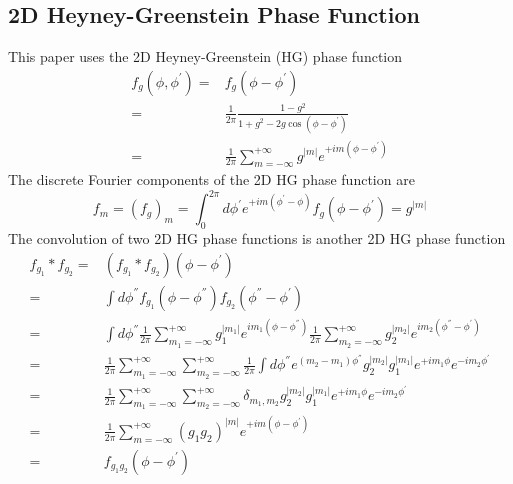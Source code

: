 \documentclass [10pt,letterpaper]{article}
\begin{document}
\subsection{2D Heyney-Greenstein Phase Function}
\label{sub:2d-heyney-greenstein-phase-function} 
This paper uses the 2D Heyney-Greenstein (HG) phase function
\begin{equation} \label{eq:hg-phase-function}
	\begin{split}
		f_g(\phi,\phi^\prime)
		=&
		f_g(\phi-\phi^\prime)
		\\
		=&
		\frac{1}{2\pi}
		\frac{1-g^2}{1+g^2-2g\cos(\phi-\phi^\prime)} 
		\\
		=&
		\frac{1}{2\pi} 
		\sum\limits_{m=-\infty}^{+\infty}
		g^{\lvert m \rvert}
		e^{+i m (\phi-\phi^\prime)} 
	\end{split}
\end{equation}
The discrete Fourier components of the 2D HG phase function are
\begin{equation} \label{eq:hg-phase-function-fm}
	f_m
	=
	(f_g)_m
	=
	\int_0^{2\pi}
	d\phi^\prime
	e^{+i m (\phi^\prime-\phi)}
	f_g(\phi-\phi^\prime)
	=g^{\lvert m \rvert}
\end{equation}
The convolution of two 2D HG phase functions is another 2D HG phase function
\begin{equation} \label{convolution-of-hg-phase-functions}
	\begin{split}
		f_{g_1}*f_{g_2}
		=&
		(f_{g_1}*f_{g_2})(\phi-\phi^\prime)
		\\
		=&
		\int d\phi^\second
		f_{g_1}(\phi-\phi^\second)
		f_{g_2}(\phi^\second-\phi^\prime)
		\\
		=&
		\int d\phi^\second
		\frac{1}{2\pi} 
		\sum\limits_{m_1=-\infty}^{+\infty}
		g_1^{\lvert m_1 \rvert}
		e^{i m_1 (\phi-\phi^\second)}
		\frac{1}{2\pi} 
		\sum\limits_{m_2=-\infty}^{+\infty}
		g_2^{\lvert m_2 \rvert}
		e^{i m_2 (\phi^\second-\phi^\prime)}
		\\
		=&
		\frac{1}{2\pi} 
		\sum\limits_{m_1=-\infty}^{+\infty}
		\sum\limits_{m_2=-\infty}^{+\infty}
		\frac{1}{2\pi} 
		\int d\phi^\second
		e^{(m_2-m_1)\phi^\second}
		g_2^{\lvert m_2 \rvert}
		g_1^{\lvert m_1 \rvert}
		e^{+i m_1 \phi}
		e^{-i m_2 \phi^\prime}
		\\
		=&
		\frac{1}{2\pi} 
		\sum\limits_{m_1=-\infty}^{+\infty}
		\sum\limits_{m_2=-\infty}^{+\infty}
		\delta_{m_1,m_2}
		g_2^{\lvert m_2 \rvert}
		g_1^{\lvert m_1 \rvert}
		e^{+i m_1 \phi}
		e^{-i m_2 \phi^\prime}
		\\
		=&
		\frac{1}{2\pi} 
		\sum\limits_{m=-\infty}^{+\infty}
		(g_1 g_2)^{\lvert m \rvert}
		e^{+i m (\phi-\phi^\prime)}
		\\
		=&
		f_{g_1 g_2}
		(\phi-\phi^\prime)
	\end{split}
\end{equation}
\end{document}
